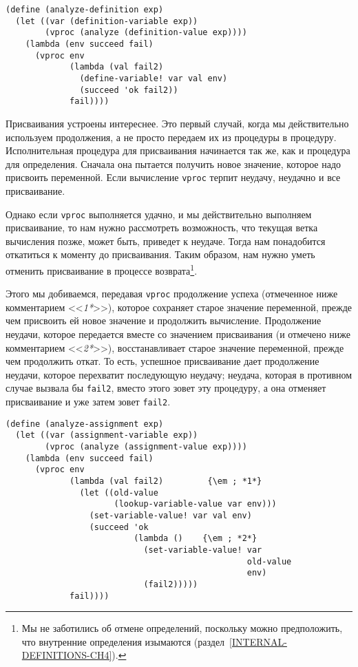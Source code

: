 \begin{Verbatim}[fontsize=\small]
(define (analyze-definition exp)
  (let ((var (definition-variable exp))
        (vproc (analyze (definition-value exp))))
    (lambda (env succeed fail)
      (vproc env                        
             (lambda (val fail2)
               (define-variable! var val env)
               (succeed 'ok fail2))
             fail))))
\end{Verbatim}

Присваивания устроены 
интереснее.  Это первый случай,
когда мы действительно используем продолжения, а не просто передаем их из 
процедуры в процедуру.  Исполнительная процедура для присваивания 
начинается так
же, как и процедура для определения.  Сначала она пытается получить новое
значение, которое надо присвоить переменной.  Если вычисление
{\tt vproc} терпит неудачу, неудачно и все присваивание.

Однако если {\tt vproc} выполняется удачно, и мы
действительно выполняем присваивание, то нам нужно рассмотреть
возможность, что текущая ветка вычисления позже, может быть, приведет
к неудаче.
Тогда нам понадобится откатиться к моменту до присваивания.  Таким образом, нам
нужно уметь отменить присваивание в процессе возврата\footnote{Мы не
заботились об отмене определений, поскольку
можно предположить, что 
внутренние определения изымаются
(раздел~\ref{INTERNAL-DEFINITIONS-CH4}).}.

Этого мы добиваемся, передавая {\tt vproc} продолжение
успеха (отмеченное ниже комментарием <<{\em *1*}>>), которое
сохраняет старое значение переменной, прежде чем присвоить ей новое
значение и продолжить вычисление.  Продолжение неудачи, которое передается 
вместе со значением присваивания (и отмечено ниже комментарием
<<{\em *2*}>>), восстанавливает старое значение
переменной, прежде чем продолжить откат.  То есть, успешное
присваивание дает продолжение неудачи, которое перехватит последующую
неудачу;  неудача, которая в противном случае вызвала бы
{\tt fail2}, вместо этого зовет эту процедуру, а она отменяет
присваивание и уже затем зовет {\tt fail2}.

\begin{Verbatim}[fontsize=\small]
(define (analyze-assignment exp)
  (let ((var (assignment-variable exp))
        (vproc (analyze (assignment-value exp))))
    (lambda (env succeed fail)
      (vproc env
             (lambda (val fail2)         {\em ; *1*}
               (let ((old-value
                      (lookup-variable-value var env))) 
                 (set-variable-value! var val env)
                 (succeed 'ok
                          (lambda ()    {\em ; *2*}
                            (set-variable-value! var
                                                 old-value
                                                 env)
                            (fail2)))))
             fail))))
\end{Verbatim}

